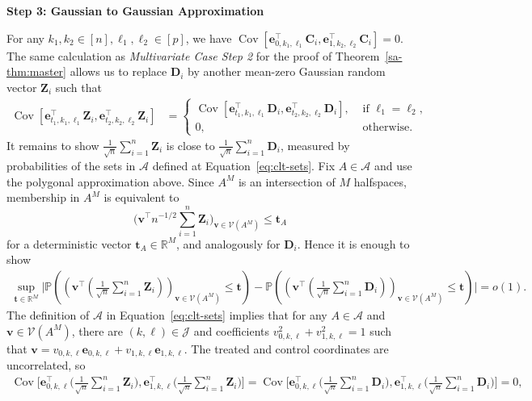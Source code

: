 \documentclass[10pt]{article}
\def\be{\mathbf{e}}
\def\bv{\mathbf{v}}
\def\bC{\mathbf{C}}
\def\bD{\mathbf{D}}
\def\bZ{\mathbf{Z}}
\def\bD{\boldsymbol{D}}
\def\P{\mathbb{P}}
\def\reals{\mathbb{R}}
\theoremstyle{definition}
\theoremstyle{remark}
\begin{document}
\begin{center}
    \textbf{Step 3: Gaussian to Gaussian Approximation}
\end{center}

For any $k_1, k_2 \in [n], \ell_1, \ell_2 \in [p]$, we have $\operatorname{Cov}[\be_{0,k_1,\ell_1}^\top \bC_i, \be_{1, k_2, \ell_2}^\top \bC_i] = 0$. The same calculation as \emph{Multivariate Case Step 2} for the proof of Theorem~\ref{sa-thm:master} allows us to replace $\bD_i$ by another mean-zero Gaussian random vector $\bZ_i$ such that
\begin{align*}
    \operatorname{Cov}[\be_{t_1, k_1, \ell_1}^\top \bZ_i, \be_{t_2, k_2, \ell_2}^\top \bZ_i] & = \begin{cases}
        \operatorname{Cov}[\be_{t_1, k_1, \ell_1}^\top \bD_i, \be_{t_2, k_2, \ell_2}^\top \bD_i], & \text{ if } \ell_1 = \ell_2, \\
        0, & \text{ otherwise}.
    \end{cases}
\end{align*}
It remains to show $\frac{1}{\sqrt{n}}\sum_{i = 1}^n \bZ_i$ is close to $\frac{1}{\sqrt{n}}\sum_{i = 1}^n \bD_i$, measured by probabilities of the sets in $\mathcal{A}$ defined at Equation~\eqref{eq:clt-sets}. Fix $A\in\mathcal{A}$ and use the polygonal approximation above. Since $A^M$ is an intersection of $M$ halfspaces, membership in $A^M$ is equivalent to
\[
    \Big(\bv^\top n^{-1/2}\sum_{i=1}^n \bZ_i\Big)_{\bv\in\mathcal V(A^M)}
    \leq \mathbf t_A
\]
for a deterministic vector $\mathbf t_A\in\mathbb R^M$, and analogously for $\bD_i$. Hence it is enough to show
\begin{align*} 
    \sup_{\mathbf{t} \in \reals^M} \bigg|\P((\bv^\top (\frac{1}{\sqrt{n}}\sum_{i = 1}^n \bZ_i ))_{\bv \in \mathcal{V}(A^M)} \leq \mathbf{t}) - \P((\bv^\top (\frac{1}{\sqrt{n}}\sum_{i = 1}^n \bD_i ))_{\bv \in \mathcal{V}(A^M)} \leq \mathbf{t})
    \bigg| = o(1).
\end{align*}
The definition of $\mathcal{A}$ in Equation~\eqref{eq:clt-sets} implies that for any $A \in \mathcal{A}$ and $\bv \in \mathcal{V}(A^M)$, there are $(k,\ell)\in\mathcal J$ and coefficients $v_{0,k,\ell}^2+v_{1,k,\ell}^2=1$ such that $\bv=v_{0,k,\ell}\be_{0,k,\ell}+v_{1,k,\ell}\be_{1,k,\ell}$. The treated and control coordinates are uncorrelated, so
\begin{align*}
    \operatorname{Cov} \bigg[\be_{0,k,\ell}^\top \Big(\frac{1}{\sqrt{n}}\sum_{i = 1}^n \bZ_i \Big), \be_{1,k,\ell}^\top \Big(\frac{1}{\sqrt{n}}\sum_{i = 1}^n \bZ_i \Big)\bigg]
    =
    \operatorname{Cov} \bigg[\be_{0,k,\ell}^\top \Big(\frac{1}{\sqrt{n}}\sum_{i = 1}^n \bD_i \Big), \be_{1,k,\ell}^\top \Big(\frac{1}{\sqrt{n}}\sum_{i = 1}^n \bD_i \Big)\bigg]
    =0,
\end{align*}
\end{document}
